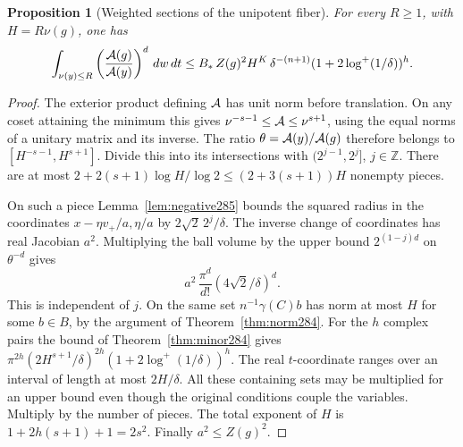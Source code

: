 \documentclass[a4paper,11pt]{article}
\newtheorem{proposition}{Proposition}[section]
\theoremstyle{definition}
\theoremstyle{remark}
\newcommand{\ZZ}{\mathbb Z}\newcommand{\ord}{\operatorname{ord}}
\numberwithin{equation}{section}
\begin{document}
\begin{proposition}[Weighted sections of the unipotent fiber]\leavevmode
\label{prop:shell285}
For every \(R\ge1\), with \(H=R\nu(g)\), one has
\[
 \int_{\nu(y)\le R}
       \left(\frac{{\cal A}(g)}{{\cal A}(y)}\right)^d\,dw\,dt
 \le B_*\,Z(g)^2 H^K\,
         \delta^{-(n+1)}(1+2\log^+(1/\delta))^h .
\]
\end{proposition}
\begin{proof}
The exterior product defining \({\cal A}\) has unit norm
before translation. On any coset attaining the minimum
this gives
\(\nu^{-s-1}\le{\cal A}\le\nu^{s+1}\), using the equal
norms of a unitary matrix and its inverse. The ratio
\(\theta={\cal A}(y)/{\cal A}(g)\) therefore belongs to
\([H^{-s-1},H^{s+1}]\). Divide this into its intersections
with \((2^{j-1},2^j]\), \(j\in\ZZ\). There are at most
\(2+2(s+1)\log H/\log2\le(2+3(s+1))H\) nonempty pieces.

On such a piece Lemma~\ref{lem:negative285} bounds the
squared radius in the coordinates \(x-\eta v_+/a,\eta/a\)
by \(2\sqrt2\,2^j/\delta\). The inverse change of coordinates
has real Jacobian \(a^2\). Multiplying the ball volume by
the upper bound \(2^{(1-j)d}\) on \(\theta^{-d}\) gives
\[
       a^2\,\frac{\pi^d}{d!}(4\sqrt2/\delta)^d .
\]
This is independent of \(j\). On the same set
\(n^{-1}\gamma(C)b\) has norm at most \(H\) for some \(b\in B\),
by the argument of Theorem~\ref{thm:norm284}.
For the \(h\) complex pairs the bound of
Theorem~\ref{thm:minor284} gives
\(\pi^{2h}(2H^{s+1}/\delta)^{2h}
       (1+2\log^+(1/\delta))^h\).
The real \(t\)-coordinate ranges over an interval of length
at most \(2H/\delta\). All these containing sets may be
multiplied for an upper bound even though the original
conditions couple the variables. Multiply by the number
of pieces. The total exponent of \(H\) is
\(1+2h(s+1)+1=2s^2\). Finally \(a^2\le Z(g)^2\).
\end{proof}
\end{document}
